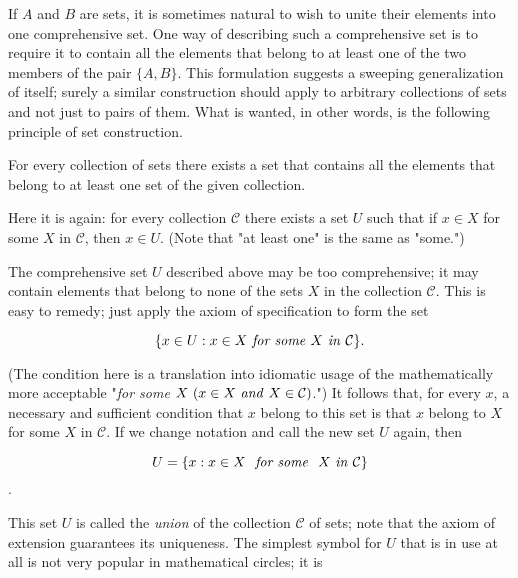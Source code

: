 
If $A$ and $B$ are sets, it is sometimes natural to wish to unite their elements into one comprehensive set. One way of describing such a comprehensive set is to require it to contain all the elements that belong to at least one of the two members of the pair $ \{ A, B \}$. This formulation suggests a sweeping  generalization of itself; surely a similar construction should apply to arbitrary collections of sets and not just to pairs of them. What is wanted, in other words, is the following principle of set construction.

\begin{named}  For every collection of sets there exists a set that contains all the elements that belong to at least one set of the given collection.
\end{named}

Here it is again: for every collection $\mathcal{C}$ there exists a set $U$ such that if $x \in X$ for some $X$ in $\mathcal{C}$, then $ x \in U$. (Note that "at least one" is the same as "some.") 

The comprehensive set $U$ described above may be too comprehensive; it may contain elements that belong to none of the sets $X$ in the collection $\mathcal{C}$. This is easy to remedy; just apply the axiom of specification to form the set 

\begin{equation*}
\{ x \in U: x \in X \text{ \textit{for some} } X \text{ \textit{in} } \mathcal{C} \}.
\end{equation*}

(The condition here is a translation into idiomatic usage of the mathematically more acceptable "\textit{for some} $X\ (x \in X \text{ \textit{and} } X \in \mathcal{C})$.") It follows that, for every $x$, a necessary and sufficient condition that $x$ belong to this set is that $x$ belong to $X$ for some $X$ in $\mathcal{C}$. If we change notation and call the new set $U$ again, then

\begin{equation*}
U = \{ x: x \in X \text{ \textit{ for some } } X \text{ \textit{in} }  \mathcal{C} \}
\end{equation*}.

This set $U$ is called the \textit{union} of the collection $\mathcal{C}$ of sets; note that the axiom of extension guarantees its uniqueness. The simplest symbol for $U$ that is in use at all is not very popular in mathematical circles; it is 

